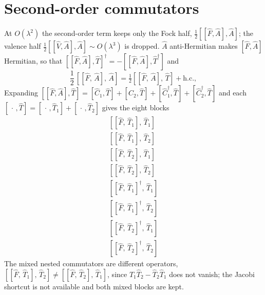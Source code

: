 \documentclass[11pt]{article}
\newcommand{\hc}{+\mathrm{h.c.}}
\begin{document}
\section{Second-order commutators}
At $O(\lambda^2)$ the second-order term keeps only the Fock half, $\tfrac{1}{2}[[\hat{F}, \hat{A}], \hat{A}]$; the valence half $\tfrac{1}{2}[[\hat{V}, \hat{A}], \hat{A}] \sim O(\lambda^3)$ is dropped.  $\hat{A}$ anti-Hermitian makes $[\hat{F}, \hat{A}]$ Hermitian, so that $[[\hat{F}, \hat{A}], \hat{T}]^\dagger = -[[\hat{F}, \hat{A}], \hat{T}^\dagger]$ and
\begin{equation}
\frac{1}{2}\, \left[\left[\hat{F},\, \hat{A}\right],\, \hat{A}\right] = \tfrac{1}{2}\left[\left[\hat{F},\, \hat{A}\right],\, \hat{T}\right] \hc,
\end{equation}
Expanding $[[\hat{F}, \hat{A}], \hat{T}] = [\hat{C}_1, \hat{T}] + [\hat{C}_2, \hat{T}] + [\hat{C}_1^\dagger, \hat{T}] + [\hat{C}_2^\dagger, \hat{T}]$ and each $[\,\cdot\,, \hat{T}] = [\,\cdot\,, \hat{T}_1] + [\,\cdot\,, \hat{T}_2]$ gives the eight blocks
\begin{align}
\left[\left[\hat{F},\, \hat{T}_{1}\right],\, \hat{T}_{1}\right] \\
\left[\left[\hat{F},\, \hat{T}_{1}\right],\, \hat{T}_{2}\right] \\
\left[\left[\hat{F},\, \hat{T}_{2}\right],\, \hat{T}_{1}\right] \\
\left[\left[\hat{F},\, \hat{T}_{2}\right],\, \hat{T}_{2}\right] \\
\left[\left[\hat{F},\, \hat{T}_{1}\right]^{\dagger},\, \hat{T}_{1}\right] \\
\left[\left[\hat{F},\, \hat{T}_{1}\right]^{\dagger},\, \hat{T}_{2}\right] \\
\left[\left[\hat{F},\, \hat{T}_{2}\right]^{\dagger},\, \hat{T}_{1}\right] \\
\left[\left[\hat{F},\, \hat{T}_{2}\right]^{\dagger},\, \hat{T}_{2}\right]
\end{align}
The mixed nested commutators are different operators, $\left[\left[\hat{F},\, \hat{T}_{1}\right],\, \hat{T}_{2}\right] \neq \left[\left[\hat{F},\, \hat{T}_{2}\right],\, \hat{T}_{1}\right]$, since $\hat{T}_1 \hat{T}_2 - \hat{T}_2 \hat{T}_1$ does not vanish; the Jacobi shortcut is not available and both mixed blocks are kept.
\end{document}
